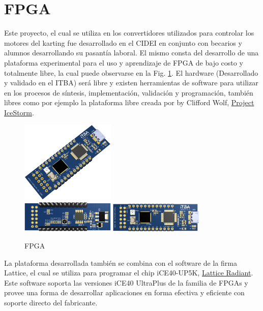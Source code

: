 \documentclass[a4paper]{article}
\begin{document}
\section{FPGA}
Este proyecto, el cual se utiliza en los convertidores utilizados para controlar los motores del karting fue desarrollado en el CIDEI en conjunto con becarios y alumnos desarrollando su pasantía laboral.
El mismo consta del desarrollo de una plataforma experimental para el uso y aprendizaje de FPGA de bajo costo y totalmente libre, la cual puede observarse en la Fig. \ref{fig:fpga}. El hardware (Desarrollado y validado en el ITBA) será libre y existen herramientas de software para utilizar en los procesos de síntesis, implementación, validación y programación, también libres como por ejemplo la plataforma libre creada por by Clifford Wolf, \href{http://www.clifford.at/icestorm/}{Project IceStorm}.
%
\begin{figure}[h]
    \centering
    \includegraphics[width=0.4\textwidth]{figs/fpga1.png} \\
    \includegraphics[width=0.4\textwidth]{figs/fpga2.png}
    \includegraphics[width=0.4\textwidth]{figs/fpga3.png}
    \caption{FPGA}
    \label{fig:fpga}
\end{figure}

La plataforma desarrollada también se combina con el software de la firma Lattice, el cual se utiliza para programar el chip iCE40-UP5K,  \href{http://www.latticesemi.com/Products/DesignSoftwareAndIP/FPGAandLDS/Radiant}{Lattice Radiant}. Este software soporta las versiones iCE40 UltraPlus de la familia de FPGAs y provee una forma de desarrollar aplicaciones en forma efectiva y eficiente con soporte directo del fabricante.
\end{document}

